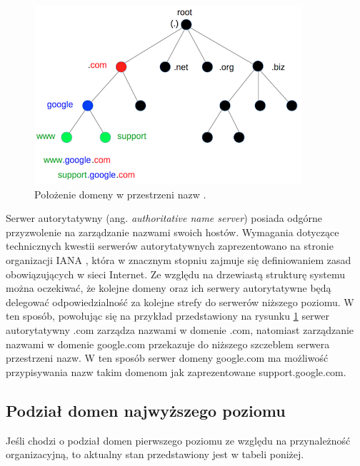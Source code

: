 \begin{center}
	\begin{figure}
	\includegraphics[scale=1]{image/domain_tree}
	\caption{Położenie domeny w przestrzeni nazw \cite{domain_tree_src}.}
	\label{example_domain_tree}
	\end{figure}
\end{center}

Serwer autorytatywny (ang. \textit{authoritative name server}) posiada odgórne przyzwolenie na zarządzanie nazwami swoich hostów.
Wymagania dotyczące technicznych kwestii serwerów autorytatywnych zaprezentowano na stronie organizacji IANA \cite{iana},
która w znacznym
stopniu zajmuje się definiowaniem zasad obowiązujących w sieci Internet. Ze względu na drzewiastą strukturę systemu można oczekiwać,
że kolejne domeny oraz ich serwery
autorytatywne będą delegować odpowiedzialność za kolejne strefy do serwerów niższego poziomu. W ten sposób, powołując się na przykład
przedstawiony na rysunku \ref{example_domain_tree} serwer autorytatywny .com zarządza nazwami w domenie .com, natomiast zarządzanie
nazwami w domenie google.com przekazuje do niższego szczeblem serwera przestrzeni nazw. W ten sposób serwer domeny google.com ma
możliwość przypisywania nazw takim domenom jak zaprezentowane support.google.com.

\subsection{Podział domen najwyższego poziomu}
\noindent Jeśli chodzi o podział domen pierwszego poziomu ze względu na przynależność organizacyjną, to aktualny stan przedstawiony jest w
tabeli poniżej.

